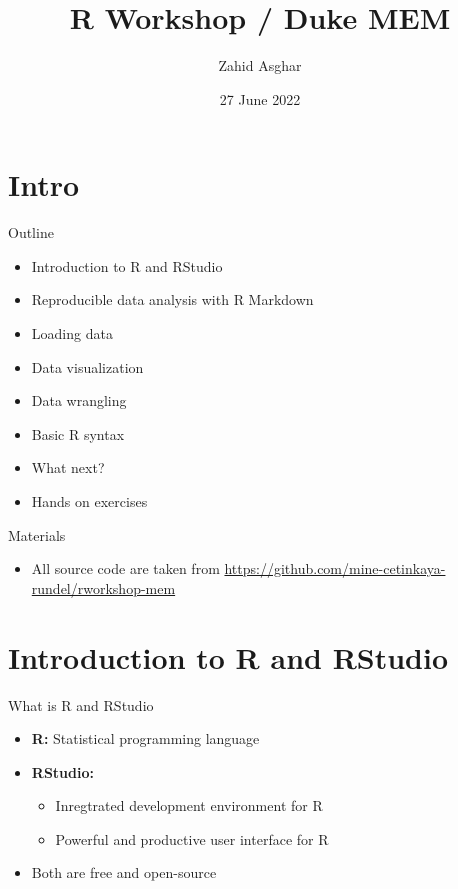 \documentclass[
  ignorenonframetext,
]{beamer}
\title{R Workshop / Duke MEM}
\author{Zahid Asghar}
\date{27 June 2022}
\providecommand{\tightlist}{%
  \setlength{\itemsep}{0pt}\setlength{\parskip}{0pt}}
\begin{document}
\frame{\titlepage}

\hypertarget{intro}{%
\section{Intro}\label{intro}}

\begin{frame}{Outline}
\protect\hypertarget{outline}{}
\begin{itemize}
\tightlist
\item
  Introduction to R and RStudio
\item
  Reproducible data analysis with R Markdown
\item
  Loading data
\item
  Data visualization
\item
  Data wrangling
\item
  Basic R syntax
\item
  What next?
\item
  Hands on exercises
\end{itemize}
\end{frame}

\begin{frame}{Materials}
\protect\hypertarget{materials}{}
\begin{itemize}
\tightlist
\item
  All source code are taken from
  \url{https://github.com/mine-cetinkaya-rundel/rworkshop-mem}
\end{itemize}
\end{frame}

\hypertarget{introduction-to-r-and-rstudio}{%
\section{Introduction to R and
RStudio}\label{introduction-to-r-and-rstudio}}

\begin{frame}{What is R and RStudio}
\protect\hypertarget{what-is-r-and-rstudio}{}
\begin{itemize}
\item
  \textbf{R:} Statistical programming language
\item
  \textbf{RStudio:}

  \begin{itemize}
  \tightlist
  \item
    Inregtrated development environment for R
  \item
    Powerful and productive user interface for R
  \end{itemize}
\item
  Both are free and open-source
\end{itemize}
\end{frame}
\end{document}
